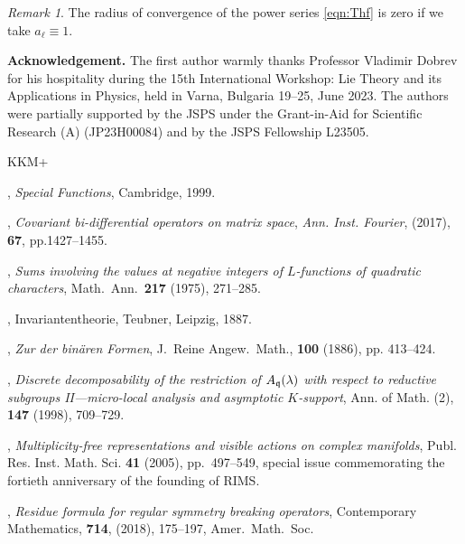 \documentclass[12pt]{amsart}
\theoremstyle{plain} %
\theoremstyle{definition} %
\theoremstyle{remark} %
\newtheorem{remark}{Remark} %
\begin{document}
\begin{remark}
The radius of convergence of the power series \eqref{eqn:Thf}
 is zero if we take $a_{\ell}\equiv 1$.  
\end{remark}
\vskip 1pc
\par\noindent
{\bf{Acknowledgement.}}
\newline
The first author warmly thanks Professor Vladimir Dobrev
 for his hospitality 
during the 15th International Workshop:
Lie Theory and its Applications 
 in Physics, 
 held in Varna, Bulgaria 19--25, 
 June 2023.  
The authors were partially supported by the JSPS
 under the Grant-in-Aid for Scientific Research (A) 
 (JP23H00084)
 and by the JSPS Fellowship L23505.  


\begin{thebibliography}{KKM+}

{}, 
{\it{Special Functions}}, 
Cambridge, 1999.  

{}, 
{\it{Covariant bi-differential operators on matrix space}}, 
\emph{Ann. Inst. Fourier}, (2017), {\bf{67}}, pp.1427--1455.

{}, 
{\it{Sums involving the values at negative integers of $L$-functions 
 of quadratic characters}}, 
Math.\ Ann.\ {\bf{217}} (1975), 271--285.  

{}, 
{Invariantentheorie}, Teubner, Leipzig, 1887.

{}, 
{\it{Zur der bin\"aren Formen}}, J.\ Reine Angew.\ Math., 
\textbf{100} (1886), pp. 413--424.

{}, 
{\textit{Discrete decomposability of the restriction of
             $A_{\frak q}(\lambda)$
            with respect to reductive subgroups {\rm{II}}---micro-local analysis and asymptotic $K$-support}}, 
Ann. of Math. (2), 
{\bf {147}} 
(1998), 
{709--729}.  

{}, 
\textit{Multiplicity-free representations and visible actions
on complex manifolds}, 
Publ. Res. Inst. Math. Sci. 
{\textbf{41}} (2005),
{pp.~497--549},
special issue commemorating the fortieth anniversary of the founding of RIMS.

{}, 
{\it{Residue formula for regular symmetry breaking operators}}, 
Contemporary Mathematics, 
{\bf{714}}, (2018), 
175--197, 
Amer.\ Math.\ Soc.


\end{thebibliography}
\end{document}
